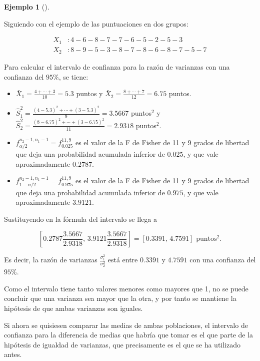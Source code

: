 \documentclass[
  spanish,
  a4paper,
]{scrreport}
\providecommand{\tightlist}{%
  \setlength{\itemsep}{0pt}\setlength{\parskip}{0pt}}
\theoremstyle{plain}
\theoremstyle{definition}
\newtheorem{example}{Ejemplo}[chapter]
\theoremstyle{definition}
\theoremstyle{remark}
\begin{document}
\begin{example}[]\protect\hypertarget{exm-intervalo-confianza-cociente-varianzas}{}\label{exm-intervalo-confianza-cociente-varianzas}

Siguiendo con el ejemplo de las puntuaciones en dos grupos:

\begin{align*}
X_1 &: 4 - 6 - 8 - 7 - 7 - 6 - 5 - 2 - 5 - 3 \\
X_2 &: 8 - 9 - 5 - 3 - 8 - 7 - 8 - 6 - 8 - 7 - 5 - 7
\end{align*}

Para calcular el intervalo de confianza para la razón de varianzas con
una confianza del \(95\%\), se tiene:

\begin{itemize}
\tightlist
\item
  \(\bar{X}_1 = \frac{4+\cdots +3}{10}=5.3\) puntos y
  \(\bar{X}_2=\frac{8+\cdots +7}{12}=6.75\) puntos.
\item
  \(\hat{S}_1^2= \frac{(4-5.3)^2+\cdots + (3-5.3)^2}{9}=3.5667\)
  puntos\(^2\) y \(\hat{S}_2^2=
  \frac{(8-6.75)^2+\cdots + (3-6.75)^2}{11}=2.9318\) puntos\(^2\).
\item
  \(f^{n_2-1,n_1-1}_{\alpha/2}=f^{11,9}_{0.025}\) es el valor de la F de
  Fisher de 11 y 9 grados de libertad que deja una probabilidad
  acumulada inferior de \(0.025\), y que vale aproximadamente
  \(0.2787\).
\item
  \(f^{n_2-1,n_1-1}_{1-\alpha/2}=f^{11,9}_{0.975}\) es el valor de la F
  de Fisher de 11 y 9 grados de libertad que deja una probabilidad
  acumulada inferior de \(0.975\), y que vale aproximadamente
  \(3.9121\).
\end{itemize}

\end{example}

Sustituyendo en la fórmula del intervalo se llega a

\[
\left[0.2787\frac{3.5667}{2.9318},\, 3.9121\frac{3.5667}{2.9318}\right] = [0.3391,\, 4.7591] \text{ puntos}^2.
\]

Es decir, la razón de varianzas \(\frac{\sigma_1^2}{\sigma_2^2}\) está
entre \(0.3391\) y \(4.7591\) con una confianza del \(95\%\).

Como el intervalo tiene tanto valores menores como mayores que 1, no se
puede concluir que una varianza sea mayor que la otra, y por tanto se
mantiene la hipótesis de que ambas varianzas son iguales.

Si ahora se quisiesen comparar las medias de ambas poblaciones, el
intervalo de confianza para la diferencia de medias que habría que tomar
es el que parte de la hipótesis de igualdad de varianzas, que
precisamente es el que se ha utilizado antes.
\end{document}

